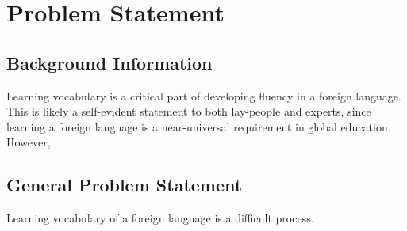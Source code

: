 \documentclass[
	letterpaper, %
]{jdf}
\begin{document}
\section{Problem Statement}



\subsection{Background Information}
Learning vocabulary is a critical part of developing fluency in a foreign language. This is likely a self-evident statement to both lay-people and experts, since learning a foreign language is a near-universal requirement in global education. However,

\subsection{General Problem Statement}
Learning vocabulary of a foreign language is a difficult process.
\end{document}
